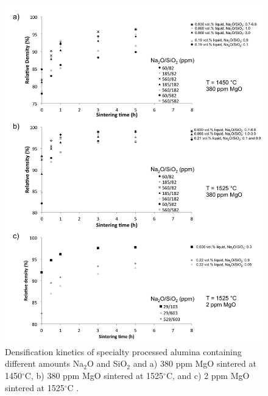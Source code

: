 \newpage
\begin{figure}[H]
	\centering
	\includegraphics[width=\textwidth]{Chapter-3/Figures/Figure3.png}
	\caption{Densification kinetics of specialty processed alumina containing different amounts Na$_{2}$O and SiO$_{2}$ and a) 380 ppm MgO sintered at 1450$^{\circ}$C, b) 380 ppm MgO sintered at 1525$^{\circ}$C, and c) 2 ppm MgO sintered at 1525$^{\circ}$C \cite{Bae1997}.}
	\label{Ch3-figure:Figure3}
\end{figure}

